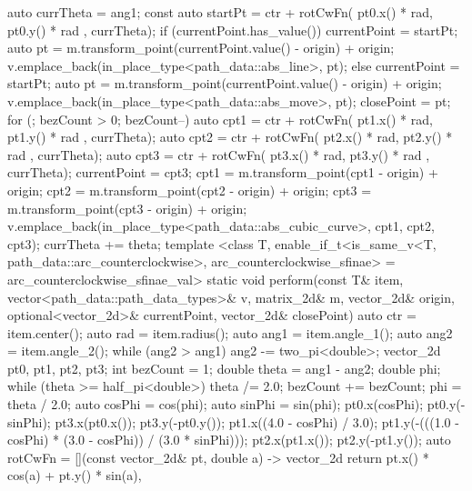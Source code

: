 \begin{codeblock}
{{{{          auto currTheta = ang1;
          const auto startPt =
            ctr + rotCwFn({ pt0.x() * rad, pt0.y() * rad }, currTheta);
          if (currentPoint.has_value()) {
            currentPoint = startPt;
            auto pt = m.transform_point(currentPoint.value() - origin) + origin;
            v.emplace_back(in_place_type<path_data::abs_line>, pt);
          }
          else {
            currentPoint = startPt;
            auto pt = m.transform_point(currentPoint.value() - origin) + origin;
            v.emplace_back(in_place_type<path_data::abs_move>, pt);
            closePoint = pt;
          }
          for (; bezCount > 0; bezCount--) {
            auto cpt1 = ctr + rotCwFn({ pt1.x() * rad, pt1.y() * rad }, currTheta);
            auto cpt2 = ctr + rotCwFn({ pt2.x() * rad, pt2.y() * rad },
              currTheta);
            auto cpt3 = ctr + rotCwFn({ pt3.x() * rad, pt3.y() * rad },
              currTheta);
            currentPoint = cpt3;
            cpt1 = m.transform_point(cpt1 - origin) + origin;
            cpt2 = m.transform_point(cpt2 - origin) + origin;
            cpt3 = m.transform_point(cpt3 - origin) + origin;
            v.emplace_back(in_place_type<path_data::abs_cubic_curve>, cpt1,
              cpt2, cpt3);
            currTheta += theta;
          }
        }
      }
      template <class T, enable_if_t<is_same_v<T, path_data::arc_counterclockwise>, arc_counterclockwise_sfinae> = arc_counterclockwise_sfinae_val>
      static void perform(const T& item, vector<path_data::path_data_types>& v, matrix_2d& m, vector_2d& origin, optional<vector_2d>& currentPoint, vector_2d& closePoint) {
        {
          auto ctr = item.center();
          auto rad = item.radius();
          auto ang1 = item.angle_1();
          auto ang2 = item.angle_2();
          while (ang2 > ang1) {
            ang2 -= two_pi<double>;
          }
          vector_2d pt0, pt1, pt2, pt3;
          int bezCount = 1;
          double theta = ang1 - ang2;
          double phi{};
          while (theta >= half_pi<double>) {
            theta /= 2.0;
            bezCount += bezCount;
          }
          phi = theta / 2.0;
          auto cosPhi = cos(phi);
          auto sinPhi = sin(phi);
          pt0.x(cosPhi);
          pt0.y(-sinPhi);
          pt3.x(pt0.x());
          pt3.y(-pt0.y());
          pt1.x((4.0 - cosPhi) / 3.0);
          pt1.y(-(((1.0 - cosPhi) * (3.0 - cosPhi)) / (3.0 * sinPhi)));
          pt2.x(pt1.x());
          pt2.y(-pt1.y());
          auto rotCwFn = [](const vector_2d& pt, double a) -> vector_2d {
            return { pt.x() * cos(a) + pt.y() * sin(a),
}}}}}}
\end{codeblock}
